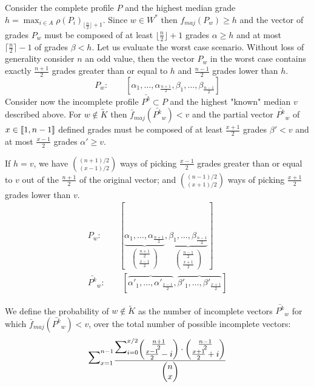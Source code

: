 \documentclass[version=3.21, pagesize, twoside=off, bibliography=totoc, DIV=calc, fontsize=12pt, a4paper]{scrartcl}
\begin{document}
Consider the complete profile $P$ and the highest median grade $h=\max_{i\in A}\rho(P_i)_{\lfloor \frac{n}{2} \rfloor + 1}$. Since $w \in W^*$ then $f_{maj}(P_{w})\geq h$ and the vector of grades $P_w$ must be composed of at least $\lfloor \frac{n}{2}\rfloor+1$ grades $\alpha \geq h$ and at most $\lceil \frac{n}{2}\rceil-1$ of grades $\beta < h$. Let us evaluate the worst case scenario.
Without loss of generality consider $n$ an odd value, then the vector $P_{w}$ in the worst case contains exactly $\frac{n+1}{2}$ grades greater than or equal to $h$ and $\frac{n-1}{2}$ grades lower than $h$.
\[P_w : \qquad [ \alpha_1, \dots , \alpha_{\frac{n+1}{2}}, \beta_1, \dots , \beta_{\frac{n-1}{2}} ] \]
Consider now the incomplete profile $\bar{P^k} \subset P$ and the highest "known" median $v$ described above. For $w \notin \tilde{K}$ then $\bar{f}_{maj}(\bar{P^k}_w) < v$ and the partial vector $\bar{P^k}_w$ of $x\in \llbracket1,n-1\rrbracket$ defined grades must be composed of at least $\frac{x+1}{2}$ grades $\beta'<v$ and at most $\frac{x-1}{2}$ grades $\alpha' \geq v$. 

If $h=v$, we have $\binom{(n+1)/2}{(x-1)/2}$ ways of picking $\frac{x-1}{2}$ grades greater than or equal to $v$ out of the $\frac{n+1}{2}$ of the original vector; and $\binom{(n-1)/2}{(x+1)/2}$ ways of picking $\frac{x+1}{2}$ grades lower than $v$.
\begin{align}
	P_{w}: \qquad [ \underbrace{\alpha_1, \dots , \alpha_{\frac{n+1}{2}}}_{\begin{pmatrix}\frac{n+1}{2} \\ \frac{x-1}{2}\end{pmatrix}}, \underbrace{\beta_1, \dots , \beta_{\frac{n-1}{2}}}_{\begin{pmatrix}\frac{n-1}{2} \\ {\frac{x+1}{2}}\end{pmatrix}} ] \\
	\bar{P^k}_w:\qquad [ \overbrace{\alpha'_1, \dots , \alpha'_{\frac{x-1}{2}}}, \overbrace{\beta'_1, \dots , \beta'_{\frac{x+1}{2}}}]
\end{align} 
\newcommand{\largemath}[1]{{\mathlarger{\mathlarger{\mathlarger{\mathlarger{\mathlarger#1}}}}}}

We define the probability of $w \notin \tilde{K}$ as the number of incomplete vectors $\bar{P^k}_w$ for which $\bar{f}_{maj}(\bar{P^k}_w) < v$, over the total number of possible incomplete vectors:
\[ \largemath{\sum}_{x=1}^{n-1}{ \frac{ \largemath{\sum}_{i=0}^{x/2}{ \begin{pmatrix}\frac{n+1}{2} \\ {\frac{x-1}{2}-i}\end{pmatrix} \cdot \begin{pmatrix}\frac{n-1}{2} \\ {\frac{x+1}{2}+i}\end{pmatrix} }}{\begin{pmatrix}n \\ x\end{pmatrix}} } \]
\end{document}
